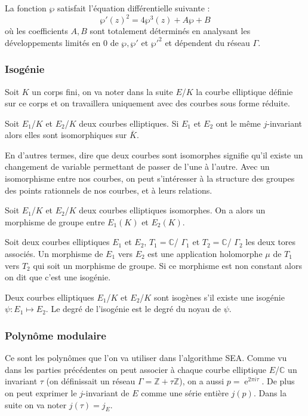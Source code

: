 \documentclass[12pt]{article}
\DeclareMathOperator{\e}{e}
\begin{document}
\begin{thm}
La fonction $\wp$ satisfait l'équation différentielle suivante : 
\begin{equation*}
{\wp'}(z)^2 = 4\wp^3(z) + A \wp + B
\end{equation*}
où les coefficients $A,B$ sont totalement déterminés en analysant les développements limités en $0$ de $\wp, {\wp'}$ et ${\wp'}^2$ et dépendent du réseau $\Gamma$.
\end{thm}

\subsubsection{Isogénie}
Soit $K$ un corps fini, on va noter dans la suite $E$/$K$ la courbe elliptique définie sur ce corps et on travaillera uniquement avec des courbes sous forme réduite.

\begin{defi}
Soit $E_1$/$K$ et $E_2$/$K$ deux courbes elliptiques. Si $E_1$ et $E_2$ ont le même $j$-invariant alors elles sont isomorphiques sur $\bar{K}$. 
\end{defi}
En d'autres termes, dire que deux courbes sont isomorphes signifie qu'il existe un changement de variable permettant de passer de l'une à l'autre. Avec un isomorphisme entre nos courbes, on peut s'intéresser à la structure des groupes des points rationnels de nos courbes, et à leurs relations.

\begin{prop}
Soit $E_1$/$K$ et $E_2$/$K$ deux courbes elliptiques isomorphes. On a alors un morphisme de groupe entre $E_1(K)$ et $E_2(K)$.
\end{prop}

\begin{defi}
Soit deux courbes elliptiques $E_1$ et $E_2$, $T_1=\mathbb{C}$/ $\Gamma_1$ et $T_2 = \mathbb{C}$/ $\Gamma_2$ les deux tores associés. Un morphisme de $E_1$ vers $E_2$ est une application holomorphe $\mu$ de $T_1$ vers $T_2$ qui soit un morphisme de groupe. Si ce morphisme est non constant alors on dit que c'est une isogénie.
\end{defi}

Deux courbes elliptiques $E_1$/$K$ et $E_2$/$K$ sont isogènes s'il existe une isogénie $\psi : E_1 \mapsto E_2$. Le degré de l’isogénie est le degré du noyau de $\psi$.


\subsubsection{Polynôme modulaire}
Ce sont les polynômes que l'on va utiliser dans l'algorithme SEA. Comme vu dans les parties précédentes on peut associer à chaque courbe elliptique $E$/$\mathbb{C}$ un invariant $\tau$ (on définissait un réseau $\Gamma = \mathbb{Z}+\tau \mathbb{Z}$), on a aussi $p=\e^{2\pi i \tau}$. De plus on peut exprimer le $j$-invariant de $E$ comme une série entière $j(p)$. Dans la suite on va noter $j(\tau) = j_E$.
\end{document}
